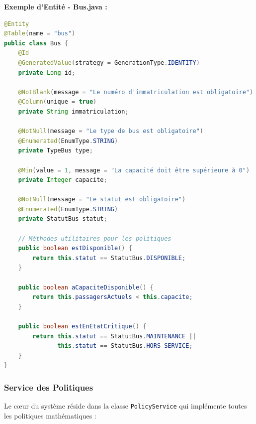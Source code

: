 \documentclass[12pt,a4paper]{article}
\begin{document}
    \begin{codebox}
        \textbf{Exemple d'Entité - Bus.java :}
        \begin{lstlisting}[language=Java]
@Entity
@Table(name = "bus")
public class Bus {
    @Id
    @GeneratedValue(strategy = GenerationType.IDENTITY)
    private Long id;

    @NotBlank(message = "Le numéro d'immatriculation est obligatoire")
    @Column(unique = true)
    private String immatriculation;

    @NotNull(message = "Le type de bus est obligatoire")
    @Enumerated(EnumType.STRING)
    private TypeBus type;

    @Min(value = 1, message = "La capacité doit être supérieure à 0")
    private Integer capacite;

    @NotNull(message = "Le statut est obligatoire")
    @Enumerated(EnumType.STRING)
    private StatutBus statut;

    // Méthodes utilitaires pour les politiques
    public boolean estDisponible() {
        return this.statut == StatutBus.DISPONIBLE;
    }

    public boolean aCapaciteDisponible() {
        return this.passagersActuels < this.capacite;
    }

    public boolean estEnEtatCritique() {
        return this.statut == StatutBus.MAINTENANCE ||
               this.statut == StatutBus.HORS_SERVICE;
    }
}
        \end{lstlisting}
    \end{codebox}

    \subsubsection{Service des Politiques}

    Le cœur du système réside dans la classe \texttt{PolicyService} qui implémente toutes les politiques mathématiques :
\end{document}
